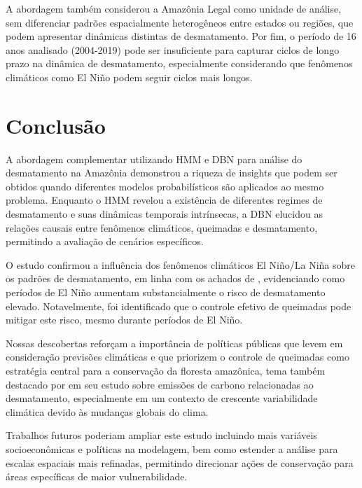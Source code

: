 \documentclass[12pt,a4paper]{article}
\begin{document}
A abordagem também considerou a Amazônia Legal como unidade de análise, sem diferenciar padrões espacialmente heterogêneos entre estados ou regiões, que podem apresentar dinâmicas distintas de desmatamento. Por fim, o período de 16 anos analisado (2004-2019) pode ser insuficiente para capturar ciclos de longo prazo na dinâmica de desmatamento, especialmente considerando que fenômenos climáticos como El Niño podem seguir ciclos mais longos.

\section{Conclusão}

A abordagem complementar utilizando HMM \citep{hmm} e DBN \citep{dbn} para análise do desmatamento na Amazônia demonstrou a riqueza de insights que podem ser obtidos quando diferentes modelos probabilísticos são aplicados ao mesmo problema. Enquanto o HMM revelou a existência de diferentes regimes de desmatamento e suas dinâmicas temporais intrínsecas, a DBN elucidou as relações causais entre fenômenos climáticos, queimadas e desmatamento, permitindo a avaliação de cenários específicos.

O estudo confirmou a influência dos fenômenos climáticos El Niño/La Niña sobre os padrões de desmatamento, em linha com os achados de \citet{elnino}, evidenciando como períodos de El Niño aumentam substancialmente o risco de desmatamento elevado. Notavelmente, foi identificado que o controle efetivo de queimadas pode mitigar este risco, mesmo durante períodos de El Niño.

Nossas descobertas reforçam a importância de políticas públicas que levem em consideração previsões climáticas e que priorizem o controle de queimadas como estratégia central para a conservação da floresta amazônica, tema também destacado por \citet{amazon} em seu estudo sobre emissões de carbono relacionadas ao desmatamento, especialmente em um contexto de crescente variabilidade climática devido às mudanças globais do clima.

Trabalhos futuros poderiam ampliar este estudo incluindo mais variáveis socioeconômicas e políticas na modelagem, bem como estender a análise para escalas espaciais mais refinadas, permitindo direcionar ações de conservação para áreas específicas de maior vulnerabilidade.



\end{document}
